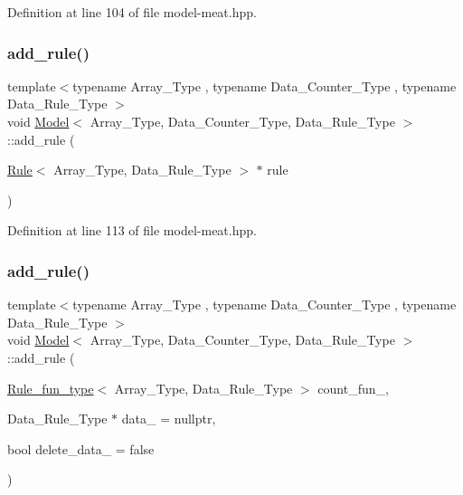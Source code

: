 Definition at line 104 of file model-\/meat.\+hpp.

\mbox{\label{class_model_aba5b01457e2f624766a72ba15b8cb6be}} 
\subsubsection{\texorpdfstring{add\+\_\+rule()}{add\_rule()}\hspace{0.1cm}{\footnotesize\ttfamily [2/3]}}
{\footnotesize\ttfamily template$<$typename Array\+\_\+\+Type , typename Data\+\_\+\+Counter\+\_\+\+Type , typename Data\+\_\+\+Rule\+\_\+\+Type $>$ \\
void \hyperlink{class_model}{Model}$<$ Array\+\_\+\+Type, Data\+\_\+\+Counter\+\_\+\+Type, Data\+\_\+\+Rule\+\_\+\+Type $>$\+::add\+\_\+rule (\begin{DoxyParamCaption}\item[{\hyperlink{class_rule}{Rule}$<$ Array\+\_\+\+Type, Data\+\_\+\+Rule\+\_\+\+Type $>$ $\ast$}]{rule }\end{DoxyParamCaption})\hspace{0.3cm}{\ttfamily [inline]}}



Definition at line 113 of file model-\/meat.\+hpp.

\mbox{\label{class_model_af3a1a343dfff4f40443bee4ddf76a0ba}} 
\subsubsection{\texorpdfstring{add\+\_\+rule()}{add\_rule()}\hspace{0.1cm}{\footnotesize\ttfamily [3/3]}}
{\footnotesize\ttfamily template$<$typename Array\+\_\+\+Type , typename Data\+\_\+\+Counter\+\_\+\+Type , typename Data\+\_\+\+Rule\+\_\+\+Type $>$ \\
void \hyperlink{class_model}{Model}$<$ Array\+\_\+\+Type, Data\+\_\+\+Counter\+\_\+\+Type, Data\+\_\+\+Rule\+\_\+\+Type $>$\+::add\+\_\+rule (\begin{DoxyParamCaption}\item[{\hyperlink{typedefs_8hpp_a2e147c9c0e8b65be614c98a5dd400d5c}{Rule\+\_\+fun\+\_\+type}$<$ Array\+\_\+\+Type, Data\+\_\+\+Rule\+\_\+\+Type $>$}]{count\+\_\+fun\+\_\+,  }\item[{Data\+\_\+\+Rule\+\_\+\+Type $\ast$}]{data\+\_\+ = {\ttfamily nullptr},  }\item[{bool}]{delete\+\_\+data\+\_\+ = {\ttfamily false} }\end{DoxyParamCaption})\hspace{0.3cm}{\ttfamily [inline]}}



